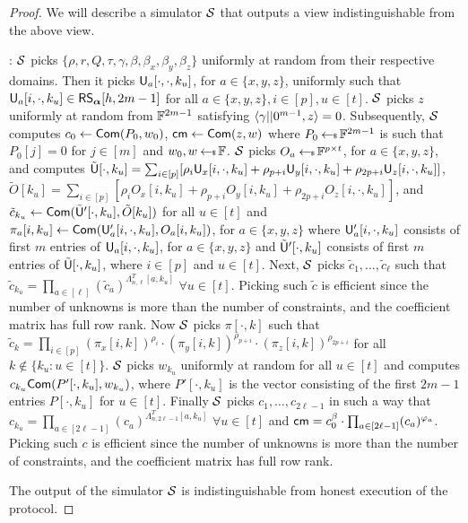 \begin{proof}
We will describe a simulator $\mathcal{S}$ that outputs a view indistinguishable from the above view.

: $\mathcal{S}$ picks $\{\rho, r, Q, \tau, \gamma, \beta, \beta_x, \beta_y, \beta_z\}$ uniformly at random from their respective domains. Then it picks $\mathsf{U}_a[\cdot, \cdot, k_u]$, for $a\in \{x,y,z\}$, uniformly such that $\mathsf{U}_a[i,\cdot,k_u] \in \mathsf{RS}_{\bm{\alpha}}[h,2m-1]$ for all $a\in\{x,y,z\}, i\in[p], u\in[t]$. $\mathcal{S}$ picks $z$ uniformly at random from $\mathbb{F}^{2m-1}$ satisfying $\langle \gamma||0^{m-1},z\rangle = 0$. Subsequently, $\mathcal{S}$ computes $c_0 \leftarrow \mathsf{Com}(P_0,w_0)$, $\mathsf{cm}\leftarrow\mathsf{Com}(z,w)$ where $P_0\hskip2.3pt{\gets\!\!\mbox{\tiny${\$}$\normalsize}}\,\mathbb{F}^{2m-1}$ is such that $P_0[j]=0$ for $j\in[m]$ and $w_0, w\hskip2.3pt{\gets\!\!\mbox{\tiny${\$}$\normalsize}}\, \mathbb{F}$. $\mathcal{S}$ picks $O_a\hskip2.3pt{\gets\!\!\mbox{\tiny${\$}$\normalsize}}\, \mathbb{F}^{p\times t}$, for $a\in\{x,y,z\}$, and computes $\tilde{\mathsf{U}}[\cdot,k_u] = \sum_{i\in[p]}[\rho_i \mathsf{U}_x[i,\cdot,k_u]+\rho_{p+i}\mathsf{U}_y[i,\cdot,k_u]+\rho_{2p+i}\mathsf{U}_z[i,\cdot,k_u]]$, $\tilde{O}[k_u] = \sum_{i\in[p]}[\rho_i O_x[i, k_u]+\rho_{p+i}O_y[i,k_u]+\rho_{2p+i}O_z[i,\cdot,k_u]]$, and $\tilde{c}_{k_u} \leftarrow \mathsf{Com}(\tilde{\mathsf{U}}'[\cdot,k_u], \tilde{O}[k_u])$ for all $u\in[t]$ and $\pi_a[i,k_u] \leftarrow \mathsf{Com}(\mathsf{U}_a'[i,\cdot,k_u],O_a[i,k_u])$, for $a\in\{x,y,z\}$ where $\mathsf{U}_a'[i,\cdot,k_u]$ consists of first $m$ entries of $\mathsf{U}_a[i,\cdot,k_u]$, for $a\in\{x,y,z\}$ and $\tilde{\mathsf{U}}'[\cdot,k_u]$ consists of first $m$ entries of $\tilde{\mathsf{U}}[\cdot,k_u]$, where $i\in[p]$ and $u\in[t]$. Next, $\mathcal{S}$ picks $\tilde{c}_1,\ldots, \tilde{c}_{\ell}$ such that $\tilde{c}_{k_u} = \prod_{a\in [\ell]} (\tilde{c}_a)^{\Lambda^T_{n,\ell}[a,k_u]}$ $\forall u\in[t]$. Picking such $\tilde{c}$ is efficient since the number of unknowns is more than the number of constraints, and the coefficient matrix has full row rank. Now $\mathcal{S}$ picks $\pi[\cdot,k]$ such that $\tilde{c}_k = \prod_{i\in[p]} (\pi_x[i,k])^{\rho_i}\cdot(\pi_y[i,k])^{\rho_{p+i}}\cdot(\pi_z[i,k])^{\rho_{2p+i}}$ for all $k\notin\{k_u:u\in[t]\}$. $\mathcal{S}$ picks $w_{k_u}$ uniformly at random for all $u\in[t]$ and computes $c_{k_u}\mathsf{Com}(P'[\cdot,k_u], w_{k_u})$, where $P'[\cdot,k_u]$ is the vector consisting of the first $2m-1$ entries $P[\cdot,k_u]$ for $u\in[t]$. Finally $\mathcal{S}$ picks $c_1,\ldots,c_{2\ell-1}$ in such a way that $c_{k_u} = \prod_{a\in[2\ell-1]} (c_a)^{\Lambda^T_{n,2\ell-1}[a,k_u]}$ $\forall u\in[t]$ and $\mathsf{cm} = c_0^{\beta}\cdot\prod_{a\in[2\ell-1]}(c_a)^{\varphi_a}$. Picking such $c$ is efficient since the number of unknowns is more than the number of constraints, and the coefficient matrix has full row rank.

The output of the simulator $\mathcal{S}$ is indistinguishable from honest execution of the protocol.
\end{proof} 

